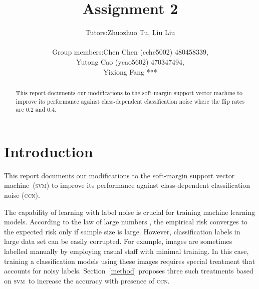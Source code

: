 \documentclass{article} %
\title{Assignment 2}
\newcommand{\svm}{\textsc{svm}}
\begin{document}
\author{%
 \begin{tabular}{rl}
  Tutors: & Zhuozhuo Tu, Liu Liu\\ \\
Group members: & Chen Chen (cche5002) 480458339, \\
& Yutong Cao (ycao5602) 470347494,\\
& Yixiong Fang ***
\end{tabular}
}

\maketitle



\begin{abstract}
This report documents our modifications to the soft-margin support vector machine to improve its performance against class-dependent classification noise where the flip rates are $0.2$ and $0.4$.
\end{abstract}
\section{Introduction}
This report documents our modifications to the soft-margin support vector machine~(\svm) to improve its performance against class-dependent classification noise (\textsc{ccn}).

The capability of learning with label noise is crucial for training machine learning models. According to the law of large numbers \citep{hardle2007applied}, the empirical risk converges to the expected risk only if sample size is large. However,  classification labels in large data set can be easily corrupted. For example, images  are sometimes labelled manually by employing casual staff with minimal training. In this case, training a classification models using these images requires special treatment that accounts for noisy labels. Section~\ref{method} proposes three such treatments based on \svm\ to increase the accuracy with presence of \textsc{ccn}.

\end{document}
